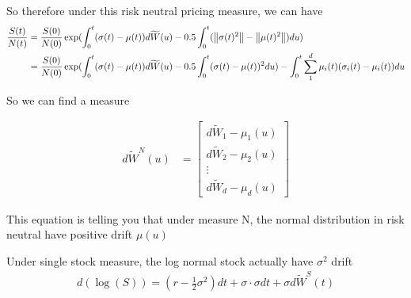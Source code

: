 So therefore under this risk neutral pricing measure, we can have
\begin{equation}
  \begin{aligned}
  \frac{S(t)}{N(t)} &= \frac{S(0)}{N(0)} \exp(\int_{0}^{t} (\sigma(t) - \mu(t)) d\widetilde{W}(u) - 0.5\int_{0} ^ {t} (\left\lVert\sigma(t) ^ 2\right\rVert - \left\lVert\mu(t) ^ 2\right\rVert) du) \\
                    &= \frac{S(0)}{N(0)} \exp(\int_{0}^{t} (\sigma(t) - \mu(t)) d\widetilde{W}(u) - 0.5\int_{0} ^ {t} (\sigma(t) - \mu(t)) ^ 2 du) - \int_0^t\sum_{1} ^ {d} \mu_{i}(t)(\sigma_{i}(t) - \mu_{i}(t)) du
  \end{aligned}
\end{equation}

So we can find a measure

\begin{equation}
  \begin{aligned}
    d\widetilde{W}^N(u) &= \begin{bmatrix}
            d\widetilde{W}_{1}  - \mu_1(u)\\
            d\widetilde{W}_{2}  - \mu_2(u)\\
            \vdots \\
            d\widetilde{W}_{d}  - \mu_d(u)
          \end{bmatrix}
    \end{aligned}
  \label{measure_change}
\end{equation}

This equation is telling you that {\color{red}under measure N, the normal distribution in risk neutral have positive drift $\mu(u)$}

\begin{exmp}
Under single stock measure, the log normal stock actually have $\sigma ^ 2$ drift
\begin{equation}
  \begin{aligned}
  d(\log(S)) = (r - \frac{1}{2} \sigma^2)dt + \sigma \cdot \sigma dt + \sigma d\widetilde{W}^S(t)
  \end{aligned}
\end{equation}
\end{exmp}

